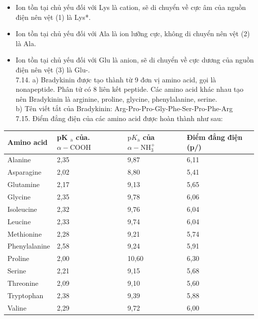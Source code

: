 \documentclass[10pt]{article}
\begin{document}
\begin{itemize}
  \item Ion tồn tại chủ yếu đối với Lys là cation, sẽ di chuyển về cực âm của nguồn điện nên vệt (1) là Lys*.
  \item Ion tồn tại chủ yếu đối với Ala là ion lưỡng cực, không di chuyển nên vệt (2) là Ala.
  \item Ion tồn tại chủ yếu đối với Glu là anion, sẽ di chuyển về cực dương của nguồn điện nên vệt (3) là Glu-.\\
7.14. a) Bradykinin được tạo thành từ 9 đơn vị amino acid, gọi là nonapeptide. Phân tử có 8 liên kết peptide. Các amino acid khác nhau tạo nên Bradykinin là arginine, proline, glycine, phenylalanine, serine.\\
b) Tên viết tắt của Bradykinin: Arg-Pro-Pro-Gly-Phe-Ser-Pro-Phe-Arg\\
7.15. Điểm đẳng điện của các amino acid được hoàn thành như sau:
\end{itemize}

\begin{center}
\begin{tabular}{|l|l|l|l|}
\hline
Amino acid & pK ${ }_{\mathrm{a}}$ của. $\alpha-\mathrm{COOH}$ & $\mathrm{p} K_{\mathrm{a}}$ của $\alpha-\mathrm{NH}_{3}^{+}$ & Điểm đẳng điện (p/) \\
\hline
Alanine & 2,35 & 9,87 & 6,11 \\
\hline
Asparagine & 2,02 & 8,80 & 5,41 \\
\hline
Glutamine & 2,17 & 9,13 & 5,65 \\
\hline
Glycine & 2,35 & 9,78 & 6,06 \\
\hline
Isoleucine & 2,32 & 9,76 & 6,04 \\
\hline
Leucine & 2,33 & 9,74 & 6,04 \\
\hline
Methionine & 2,28 & 9,21 & 5,74 \\
\hline
Phenylalanine & 2,58 & 9,24 & 5,91 \\
\hline
Proline & 2,00 & 10,60 & 6,30 \\
\hline
Serine & 2,21 & 9,15 & 5,68 \\
\hline
Threonine & 2,09 & 9,10 & 5,60 \\
\hline
Tryptophan & 2,38 & 9,39 & 5,88 \\
\hline
Valine & 2,29 & 9,72 & 6,00 \\
\hline
\end{tabular}
\end{center}
\end{document}
